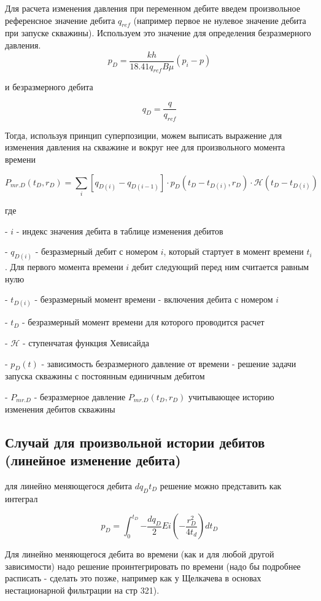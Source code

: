 Для расчета изменения давления при переменном дебите введем произвольное референсное значение дебита $ q_{ref} $ (например первое не нулевое значение дебита при запуске скважины). Используем это значение для определения безразмерного давления.
$$ p_D = \frac{kh}{ 18.41 q_{ref} B \mu} \left( p_i - p \right) $$

и безразмерного дебита 

$$q_D = \frac{q}{q_{ref}} $$

Тогда, используя принцип суперпозиции, можем выписать выражение для изменения давления на скважине и вокруг нее для произвольного момента времени

\begin{equation}
	P_{mr.D}(t_D, r_D) = \sum_i \left[ q_{D(i)}-q_{D(i-1)} \right] \cdot p_D\left(t_D-t_{D(i)}, r_D\right)\cdot \mathcal{H}(t_D-t_{D(i)}) \tag{7} 
\end{equation}

где

- $i$ - индекс значения дебита в таблице изменения дебитов

- $q_{D(i)}$ - безразмерный дебит с номером $i$, который стартует в момент времени $t_i$. Для первого момента времени $i$ дебит следующий перед ним считается равным нулю

- $t_{D(i)}$ - безразмерный момент времени - включения дебита с номером $i$

- $t_{D}$ - безразмерный момент времени для которого проводится расчет

- $\mathcal{H}$ - ступенчатая функция Хевисайда

- $p_D\left(t\right)$ - зависимость безразмерного давление от времени - решение задачи запуска скважины с постоянным единичным дебитом

- $P_{mr.D} $ - безразмерное давление $P_{mr.D}(t_D, r_D)$ учитывающее историю изменения дебитов скважины

\subsection{Случай для произвольной истории дебитов (линейное изменение дебита)}

для линейно меняющегося дебита $dq_D t_D$ решение можно представить как интеграл

$$
p_D = \int_0^{t_D}{- \frac{dq_D}{2} Ei \left(- \dfrac{ r_D^2}{4t_d} \right) dt_D}
$$



Для линейно меняющегося дебита во времени (как и для любой другой зависимости) надо решение проинтегрировать по времени (надо бы подробнее расписать - сделать это позже, например как у Щелкачева в основах нестационарной фильтрации на стр 321).


